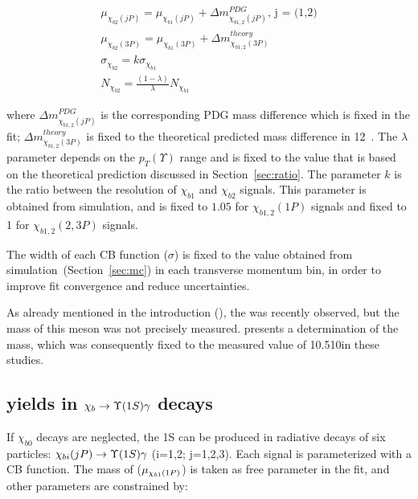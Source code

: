 \begin{equation}
  \begin{aligned}
\mu_{\chi_{b2}(jP)} = \mu_{\chi_{b1}(jP)} + \Delta m_{\chi_{b1,2}(jP)}^{PDG} \text{, j = (1,2)}\\
\mu_{\chi_{b2}(3P)} = \mu_{\chi_{b1}(3P)} + \Delta m_{\chi_{b1,2}(3P)}^{theory} \\
\sigma_{\chi_{b2}} = k \sigma_{\chi_{b1}}\\
N_{\chi_{b2}} = \frac{(1-\lambda)}{\lambda} N_{\chi_{b1}}
  \end{aligned}
\end{equation}

\noindent where $\Delta m_{\chi_{b1,2}(jP)}^{PDG}$ is the corresponding PDG
mass difference which is fixed in the fit; $\Delta
m_{\chi_{b1,2}(3P)}^{theory}$ is fixed to the theoretical predicted mass
difference in 12\mevcc~\cite{Motyka:1997di}. The $\lambda$ parameter depends on
the $p_T(\Upsilon)$ range and is fixed to the value that is based on the
theoretical prediction discussed in Section~\ref{sec:ratio}. The parameter $k$
is the ratio between the resolution of $\chi_{b1}$ and $\chi_{b2}$ signals.
This parameter is obtained from simulation, and is fixed to $1.05$ for
$\chi_{b1,2}(1P)$ signals and fixed to 1 for $\chi_{b1,2}(2,3P)$ signals.

The width of each CB function ($\sigma$) is fixed to the value obtained from
simulation~(Section~\ref{sec:mc}) in each transverse momentum bin, in order to
improve fit convergence and reduce uncertainties.

As already mentioned in the introduction (), the \chibThreeP  was
recently observed, but the mass of this meson was not precisely measured. 
 presents a determination of the \chibThreeP mass, which 
was consequently fixed to the measured value of 10.510\gevcc in these studies. 

\subsection{\texorpdfstring{\chib}{xb} yields in
\texorpdfstring{$\chib \to \Y1S \gamma$}{xb -> Y\(1S\) gamma } decays}
\label{sec:chib:ups1s:fit}

If $\chi_{b0}$ decays are neglected, the \Y1S can be produced in radiative decays
of six \chib particles: $\chi_{bi}(jP) \to \Y1S \gamma$ (i=1,2; j=1,2,3). 
Each \chib signal is parameterized with a CB function.
The mass of \chiboneOneP ($\mu_{\chi_{b 1}(1P)}$) is taken as free parameter in the fit, and  other
parameters are constrained by:

